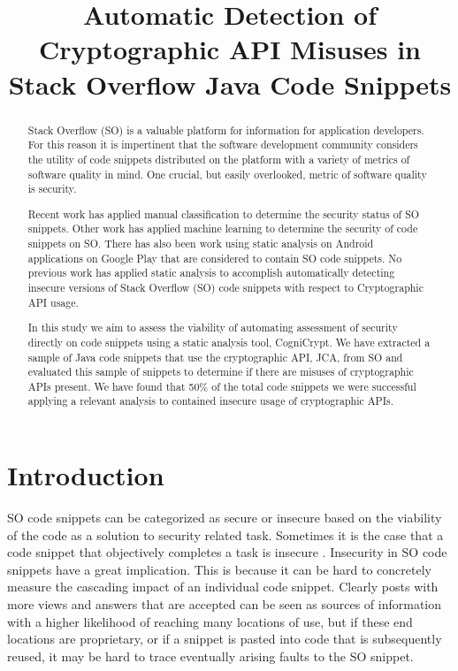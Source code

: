 \documentclass[10pt, conference]{IEEEtran}
\begin{document}
\title{Automatic Detection of Cryptographic API Misuses in Stack Overflow Java Code Snippets\\}

\author{
}

\maketitle

\begin{abstract}
Stack Overflow (SO) is a valuable platform for information for application developers. For this reason it is impertinent that the software development community considers the utility of code snippets distributed on the platform with a variety of metrics of software quality in mind. One crucial, but easily overlooked, metric of software quality is security. 

Recent work has applied manual classification to determine the security status of SO snippets. Other  work has applied machine learning to determine the security of code snippets on SO. There has also been work using static analysis on Android applications on Google Play that are considered to contain SO code snippets. No previous work has applied static analysis to accomplish automatically detecting insecure versions of Stack Overflow (SO) code snippets with respect to Cryptographic API usage.

In this study we aim to assess the viability of automating assessment of security directly on code snippets using a static analysis tool, CogniCrypt. We have extracted a sample of Java code snippets that use the cryptographic API, JCA, from SO and evaluated this sample of snippets to determine if there are misuses of cryptographic APIs present. We have found that 50\% of the total code snippets we were successful applying a relevant analysis to contained insecure usage of cryptographic APIs. 
\end{abstract}

\section{Introduction}
SO code snippets can be categorized as secure or insecure based on the viability of the code as a solution to security related task. Sometimes it is the case that a code snippet that objectively completes a task is insecure \cite{}. Insecurity in SO code snippets have a great implication. This is because it can be hard to concretely measure the cascading impact of an individual code snippet. 
Clearly posts with more views and answers that are accepted can be seen as sources of information with a higher likelihood of reaching many locations of use, but if  these end locations are proprietary, or if a snippet is pasted into code that is subsequently reused, it may be hard to trace eventually arising faults to the SO snippet.
\end{document}
